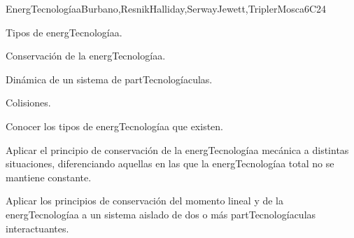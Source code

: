\begin{syllabus}
\begin{unit}{}{EnergTecnologíaa}{Burbano,ResnikHalliday,SerwayJewett,TriplerMosca}{6}{C24}
\begin{topics}
      \item Tipos de energTecnologíaa.
      \item Conservación de la energTecnologíaa. 
      \item Dinámica de un sistema de partTecnologíaculas.
      \item Colisiones.
  \end{topics}

   \begin{learningoutcomes}
      \item Conocer los tipos de energTecnologíaa que existen.
      \item Aplicar el principio de conservación de la energTecnologíaa mecánica a distintas situaciones, diferenciando aquellas en las que la energTecnologíaa total no se mantiene constante. 
      \item Aplicar los principios de conservación del momento lineal y de la energTecnologíaa a un sistema aislado de dos o más partTecnologíaculas interactuantes.
   \end{learningoutcomes}
\end{unit}

\begin{coursebibliography}
\end{coursebibliography}

\end{syllabus}
